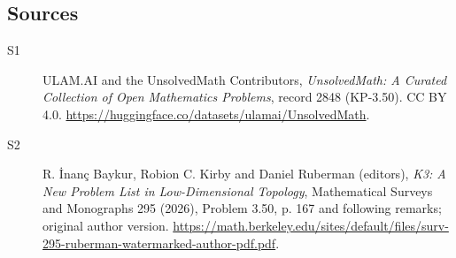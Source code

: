 \documentclass[11pt]{article}
\begin{document}
\subsection{Sources}
\begin{description}
\item[\hypertarget{source:2848:1}{S1}] ULAM.AI and the UnsolvedMath Contributors, \emph{UnsolvedMath: A Curated Collection of Open Mathematics Problems}, record 2848 (KP-3.50). CC BY 4.0. \url{https://huggingface.co/datasets/ulamai/UnsolvedMath}.
\item[\hypertarget{source:2848:2}{S2}] R. İnanç Baykur, Robion C. Kirby and Daniel Ruberman (editors), \emph{K3: A New Problem List in Low-Dimensional Topology}, Mathematical Surveys and Monographs 295 (2026), Problem 3.50, p. 167 and following remarks; original author version. \url{https://math.berkeley.edu/sites/default/files/surv-295-ruberman-watermarked-author-pdf.pdf}.
\end{description}
\label{end:2848}
\end{document}
